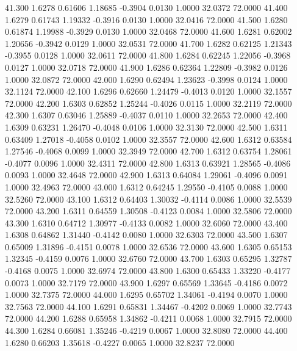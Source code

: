  41.300   1.6278   0.61606   1.18685  -0.3904   0.0130   1.0000  32.0372  72.0000
  41.400   1.6279   0.61743   1.19332  -0.3916   0.0130   1.0000  32.0416  72.0000
  41.500   1.6280   0.61874   1.19988  -0.3929   0.0130   1.0000  32.0468  72.0000
  41.600   1.6281   0.62002   1.20656  -0.3942   0.0129   1.0000  32.0531  72.0000
  41.700   1.6282   0.62125   1.21343  -0.3955   0.0128   1.0000  32.0611  72.0000
  41.800   1.6284   0.62245   1.22056  -0.3968   0.0127   1.0000  32.0718  72.0000
  41.900   1.6286   0.62364   1.22809  -0.3982   0.0126   1.0000  32.0872  72.0000
  42.000   1.6290   0.62494   1.23623  -0.3998   0.0124   1.0000  32.1124  72.0000
  42.100   1.6296   0.62660   1.24479  -0.4013   0.0120   1.0000  32.1557  72.0000
  42.200   1.6303   0.62852   1.25244  -0.4026   0.0115   1.0000  32.2119  72.0000
  42.300   1.6307   0.63046   1.25889  -0.4037   0.0110   1.0000  32.2653  72.0000
  42.400   1.6309   0.63231   1.26470  -0.4048   0.0106   1.0000  32.3130  72.0000
  42.500   1.6311   0.63409   1.27018  -0.4058   0.0102   1.0000  32.3557  72.0000
  42.600   1.6312   0.63584   1.27546  -0.4068   0.0099   1.0000  32.3949  72.0000
  42.700   1.6312   0.63754   1.28061  -0.4077   0.0096   1.0000  32.4311  72.0000
  42.800   1.6313   0.63921   1.28565  -0.4086   0.0093   1.0000  32.4648  72.0000
  42.900   1.6313   0.64084   1.29061  -0.4096   0.0091   1.0000  32.4963  72.0000
  43.000   1.6312   0.64245   1.29550  -0.4105   0.0088   1.0000  32.5260  72.0000
  43.100   1.6312   0.64403   1.30032  -0.4114   0.0086   1.0000  32.5539  72.0000
  43.200   1.6311   0.64559   1.30508  -0.4123   0.0084   1.0000  32.5806  72.0000
  43.300   1.6310   0.64712   1.30977  -0.4133   0.0082   1.0000  32.6060  72.0000
  43.400   1.6308   0.64862   1.31440  -0.4142   0.0080   1.0000  32.6303  72.0000
  43.500   1.6307   0.65009   1.31896  -0.4151   0.0078   1.0000  32.6536  72.0000
  43.600   1.6305   0.65153   1.32345  -0.4159   0.0076   1.0000  32.6760  72.0000
  43.700   1.6303   0.65295   1.32787  -0.4168   0.0075   1.0000  32.6974  72.0000
  43.800   1.6300   0.65433   1.33220  -0.4177   0.0073   1.0000  32.7179  72.0000
  43.900   1.6297   0.65569   1.33645  -0.4186   0.0072   1.0000  32.7375  72.0000
  44.000   1.6295   0.65702   1.34061  -0.4194   0.0070   1.0000  32.7563  72.0000
  44.100   1.6291   0.65831   1.34467  -0.4202   0.0069   1.0000  32.7743  72.0000
  44.200   1.6288   0.65958   1.34862  -0.4211   0.0068   1.0000  32.7915  72.0000
  44.300   1.6284   0.66081   1.35246  -0.4219   0.0067   1.0000  32.8080  72.0000
  44.400   1.6280   0.66203   1.35618  -0.4227   0.0065   1.0000  32.8237  72.0000
